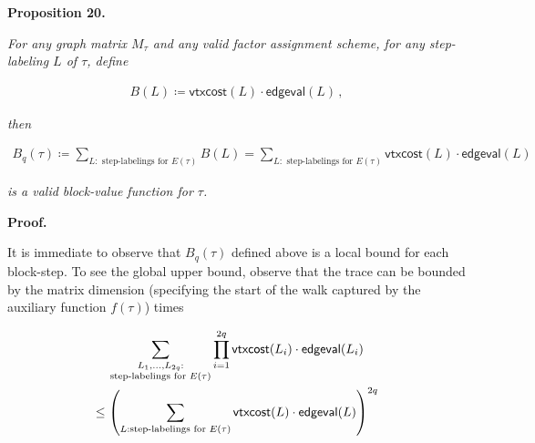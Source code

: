 

\par\medskip\noindent\textbf{
\textbf{Proposition 20}\textbf{.}
}\par



\emph{For any graph matrix $M_{\tau}$ and any valid factor assignment scheme, for any step-labeling $L$ of $\tau$, define}\par


\[\begin{gathered}
B(L)\coloneqq\mathsf{vtxcost}(L)\cdot\mathsf{edgeval}(L)\,,
\end{gathered}\]


\emph{then}\par


\[\begin{gathered}
\displaystyle B_{q}(\tau)\coloneqq\sum_{L:\text{ step-labelings for }E(\tau)}B(L)=\sum_{L:\text{ step-labelings for }E(\tau)}\mathsf{vtxcost}(L)\cdot\mathsf{edgeval}(L)
\end{gathered}\]


\emph{is a valid block-value function for $\tau$.}\par






\par\medskip\noindent\textbf{Proof.}\par




It is immediate to observe that $B_{q}(\tau)$ defined above is a local bound for each block-step.
To see the global upper bound, observe that the trace can be bounded by the matrix dimension (specifying the start of the walk captured by the auxiliary function $f(\tau)$) times\par


\[\begin{gathered}
\displaystyle\sum_{\begin{subarray}{c}L_{1},\dots,L_{2q}:\\
\text{step-labelings for $E(\tau)$}\end{subarray}}\prod_{i=1}^{2q}\mathsf{vtxcost}(L_{i})\cdot\mathsf{edgeval}(L_{i}) \\
\displaystyle\leq\left(\sum_{L:\text{step-labelings for }E(\tau)}\mathsf{vtxcost}(L)\cdot\mathsf{edgeval}(L)\right)^{2q}
\end{gathered}\]


